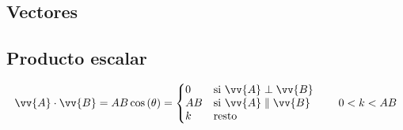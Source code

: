 \documentclass[a4paper, 8pt]{extarticle}
\renewcommand{\vec}[1]{\vv{{#1}}}
\begin{document}
\pagestyle{empty}
\renewcommand{\arraystretch}{1.5}

\begin{multicols}{3}
  \section{Vectores}
  \subsection{Producto escalar}
  \[ \vec{A} \cdot \vec{B} = AB \cos \left( \theta \right) = \left\lbrace
    \begin{matrix*}[l]
      0 & \text{si } \vec{A} \perp \vec{B}\\
      AB & \text{si }\vec{A} \parallel \vec{B}\\
      k & \text{resto}
    \end{matrix*} \right. \qquad 0 < k < AB\]


\end{multicols}
\end{document}
